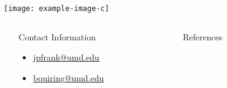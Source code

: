 \documentclass[final]{beamer}
\newlength{\sepmargin}
\newlength{\sepwid}
\newlength{\onecolwid}
\begin{document}
\begin{frame}[t]
\begin{columns}[t]
\begin{column}{\onecolwid}
\begin{block}{ }
          \begin{figure}
            \vspace*{-0.95cm}
            \texttt{[image: example-image-c]}
	  \end{figure}
        
        
      \end{block}
    \end{column}
    
    \begin{column}{\sepmargin} \end{column}
  \end{columns} 
  
  \begin{columns}[t] %
    
    \begin{column}{\sepmargin} \end{column}
    \begin{column}{\onecolwid} %
      
      \vspace*{-0.9cm}
      \begin{alertblock}{\large Contact Information}
        \vspace*{-0.5cm}
	\begin{footnotesize}
	  \begin{itemize}
	  \item \href{mailto:jpfrank@umd.edu}{jpfrank@umd.edu}
	  \item \href{mailto:bquiring@umd.edu}{bquiring@umd.edu}
	  \end{itemize}
	\end{footnotesize}	
	
      \end{alertblock}
    \end{column} %
    \begin{column}{\sepwid}\end{column} %
    \begin{column}{\onecolwid} %
      \begin{block}{\large References}
	\vspace*{-0.5cm}
        \nocite{*} %
	       {\footnotesize
		 }
      \end{block} 
    \end{column} %
    
    \begin{column}{\sepmargin}\end{column} %
    
  \end{columns} %


\end{frame} %
\end{document}
